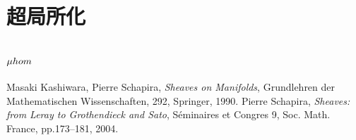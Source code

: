\documentclass[uplatex,dvipdfmx,a4paper,10pt,draft]{jsarticle}
\theoremstyle{definition}
\numberwithin{equation}{section}
\newcommand{\mhom}{\mathop{\mu\hspace{-0pt}hom}\nolimits}
\theoremstyle{mystyle}
\begin{document}
\section{超局所化{\cite[\S 4.3]{KS90}}}
\section{\(\mhom\){\cite[\S 4.4]{KS90}}}




\begin{thebibliography}{20} 
     Masaki Kashiwara, Pierre Schapira, 
      \textit{Sheaves on Manifolds}, 
      Grundlehren der Mathematischen Wissenschaften, 292, Springer, 1990.
     Pierre Schapira, 
      \textit{Sheaves: from Leray to Grothendieck and Sato}, 
      S\'eminaires et Congres 9, Soc. Math. France, pp.173--181, 2004.
\end{thebibliography}
  
\end{document}
